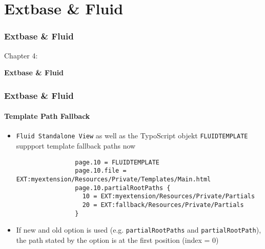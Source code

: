 %

\section{Extbase \& Fluid}
\begin{frame}[fragile]
	\frametitle{Extbase \& Fluid}

	\begin{center}\huge{Chapter 4:}\end{center}
	\begin{center}\huge{\color{typo3darkgrey}\textbf{Extbase \& Fluid}}\end{center}

\end{frame}


\begin{frame}[fragile]
	\frametitle{Extbase \& Fluid}
	\framesubtitle{Template Path Fallback}

	\lstset{
		basicstyle=\tiny\ttfamily
	}

	\begin{itemize}
		\item \texttt{Fluid Standalone View} as well as the TypoScript objekt \texttt{FLUIDTEMPLATE} suppport template fallback paths now

			\begin{lstlisting}
				page.10 = FLUIDTEMPLATE
				page.10.file = EXT:myextension/Resources/Private/Templates/Main.html
				page.10.partialRootPaths {
				  10 = EXT:myextension/Resources/Private/Partials
				  20 = EXT:fallback/Resources/Private/Partials
				}
			\end{lstlisting}

		\item If new and old option is used (e.g. \texttt{partialRootPaths} and \texttt{partialRootPath}),
			the path stated by the option is at the first position (index = 0)

	\end{itemize}

\end{frame}

